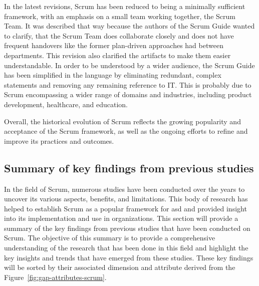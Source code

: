 In the latest revisions, Scrum has been reduced to being a minimally sufficient framework, with an emphasis on a small team working together, the Scrum Team. It was described that way because the authors of the Scrum Guide wanted to clarify, that the Scrum Team does collaborate closely and does not have frequent handovers like the former \gls{plan-driven} approaches had between departments. This revision also clarified the artifacts to make them easier understandable. In order to be understood by a wider audience, the Scrum Guide has been simplified in the language by eliminating redundant, complex statements and removing any remaining reference to IT. This is probably due to Scrum encompassing a wider range of domains and industries, including product development, healthcare, and education.~\cite[Revision 2017--2020]{Schwaber2020SGR}

Overall, the historical evolution of Scrum reflects the growing popularity and acceptance of the Scrum \gls{framework}, as well as the ongoing efforts to refine and improve its practices and outcomes.

\subsection*{Summary of key findings from previous studies}
In the field of Scrum, numerous studies have been conducted over the years to uncover its various aspects, benefits, and limitations. This body of research has helped to establish Scrum as a popular \gls{framework} for \ac{asd} and provided insight into its implementation and use in organizations. This section will provide a summary of the key findings from previous studies that have been conducted on Scrum. The objective of this summary is to provide a comprehensive understanding of the research that has been done in this field and highlight the key insights and trends that have emerged from these studies. These key findings will be sorted by their associated dimension and attribute derived from the Figure~\ref{fig:gap-attributes-scrum}.

